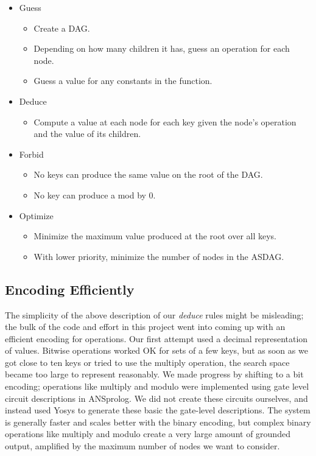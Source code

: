 \documentclass{article}
\begin{document}
\begin{itemize}
\item{
	Guess
	\begin{itemize}
		\item Create a DAG.
		\item Depending on how many children it has, guess an operation for each node.
		\item Guess a value for any constants in the function.
	\end{itemize}
}
\item{
	Deduce
	\begin{itemize}
		\item Compute a value at each node for each key given the node's operation and the value of its children.
	\end{itemize}
}
\item{
	Forbid
	\begin{itemize}
		\item No keys can produce the same value on the root of the DAG.
		\item No key can produce a mod by 0.
	\end{itemize}
}
\item{
	Optimize
	\begin{itemize}
		\item Minimize the maximum value produced  at the root over all keys.
		\item With lower priority, minimize the number of nodes in the ASDAG.
	\end{itemize}
}
\end{itemize}

\subsection{Encoding Efficiently}
The simplicity of the above description of our \textit{deduce} rules might be misleading; the bulk of the code and effort in this project went into coming up with an efficient encoding for operations. Our first attempt used a decimal representation of values. Bitwise operations worked OK for sets of a few keys, but as soon as we got close to ten keys or tried to use the multiply operation, the search space became too large to represent reasonably. We made progress by shifting to a bit encoding; operations like multiply and modulo were implemented using gate level circuit descriptions in ANSprolog. We did not create these circuits ourselves, and instead used Yosys to generate these basic the gate-level descriptions.  The system is generally faster and scales better with the binary encoding, but complex binary operations like multiply and modulo create a very large amount of grounded output, amplified by the maximum number of nodes we want to consider. 
\end{document}

